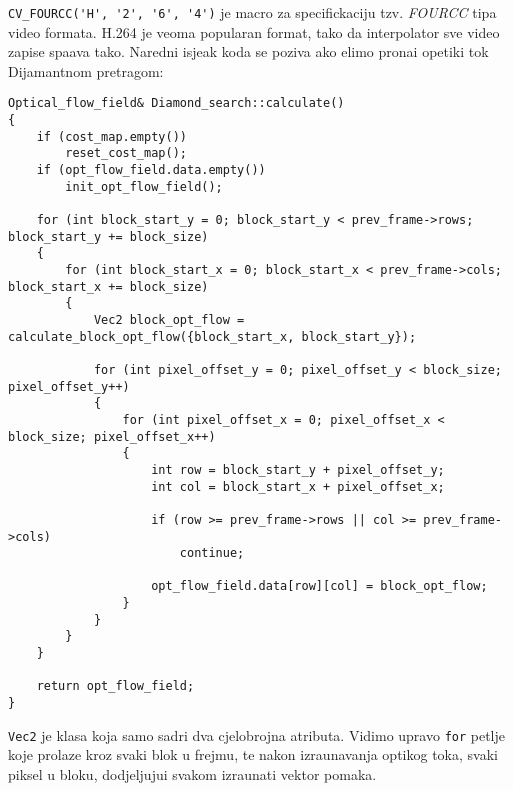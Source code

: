 \lstinline{CV_FOURCC('H', '2', '6', '4')} je macro za specifickaciju tzv. \textit{FOURCC} tipa video formata. H.264 je veoma popularan format, tako da interpolator sve video zapise spa\sh ava tako.
Naredni isje\ch ak koda se poziva ako \zh elimo prona\cj i opeti\ch ki tok Dijamantnom pretragom:
\begin{lstlisting}
Optical_flow_field& Diamond_search::calculate()
{
    if (cost_map.empty())
        reset_cost_map();
    if (opt_flow_field.data.empty())
        init_opt_flow_field();

    for (int block_start_y = 0; block_start_y < prev_frame->rows; block_start_y += block_size)
    {
        for (int block_start_x = 0; block_start_x < prev_frame->cols; block_start_x += block_size)
        {
            Vec2 block_opt_flow = calculate_block_opt_flow({block_start_x, block_start_y});

            for (int pixel_offset_y = 0; pixel_offset_y < block_size; pixel_offset_y++)
            {
                for (int pixel_offset_x = 0; pixel_offset_x < block_size; pixel_offset_x++)
                {
                    int row = block_start_y + pixel_offset_y;
                    int col = block_start_x + pixel_offset_x;

                    if (row >= prev_frame->rows || col >= prev_frame->cols)
                        continue;

                    opt_flow_field.data[row][col] = block_opt_flow;
                }
            }
        }
    }

    return opt_flow_field;
}
\end{lstlisting}

\lstinline{Vec2} je klasa koja samo sadr\zh i dva cjelobrojna atributa. Vidimo upravo \lstinline{for} petlje koje prolaze kroz svaki blok u frejmu, te nakon izra\ch unavanja opti\ch kog toka, svaki piksel
u bloku, dodjeljuju\cj i svakom izra\ch unati vektor pomaka.

